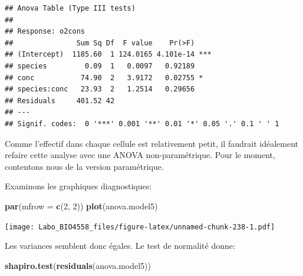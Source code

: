 \documentclass[12pt,]{book}
\newenvironment{Shaded}{\begin{snugshade}}{\end{snugshade}}
\newcommand{\DataTypeTok}[1]{\textcolor[rgb]{0.27,0.27,0.27}{#1}}
\newcommand{\DecValTok}[1]{\textcolor[rgb]{0.06,0.06,0.06}{#1}}
\newcommand{\KeywordTok}[1]{\textcolor[rgb]{0.27,0.27,0.27}{\textbf{#1}}}
\newcommand{\NormalTok}[1]{#1}
\newcommand{\OperatorTok}[1]{\textcolor[rgb]{0.43,0.43,0.43}{\textbf{#1}}}
\newcommand{\StringTok}[1]{\textcolor[rgb]{0.5,0.5,0.5}{#1}}
\begin{document}
\begin{Shaded}
\end{Shaded}

\begin{verbatim}
## Anova Table (Type III tests)
## 
## Response: o2cons
##               Sum Sq Df  F value    Pr(>F)    
## (Intercept)  1185.60  1 124.0165 4.101e-14 ***
## species         0.09  1   0.0097   0.92189    
## conc           74.90  2   3.9172   0.02755 *  
## species:conc   23.93  2   1.2514   0.29656    
## Residuals     401.52 42                       
## ---
## Signif. codes:  0 '***' 0.001 '**' 0.01 '*' 0.05 '.' 0.1 ' ' 1
\end{verbatim}

Comme l'effectif dans chaque cellule est relativement petit, il faudrait idéalement refaire cette analyse avec une ANOVA non-paramétrique. Pour le moment, contentons nous de la version paramétrique.

Examinons les graphiques diagnostiques:

\begin{Shaded}
\begin{Highlighting}[]
\KeywordTok{par}\NormalTok{(}\DataTypeTok{mfrow =} \KeywordTok{c}\NormalTok{(}\DecValTok{2}\NormalTok{, }\DecValTok{2}\NormalTok{))}
\KeywordTok{plot}\NormalTok{(anova.model5)}
\end{Highlighting}
\end{Shaded}

\texttt{[image: Labo\_BIO4558\_files/figure-latex/unnamed-chunk-238-1.pdf]}

Les variances semblent donc égales. Le test de normalité donne:

\begin{Shaded}
\begin{Highlighting}[]
\KeywordTok{shapiro.test}\NormalTok{(}\KeywordTok{residuals}\NormalTok{(anova.model5))}
\end{Highlighting}
\end{Shaded}
\end{document}
